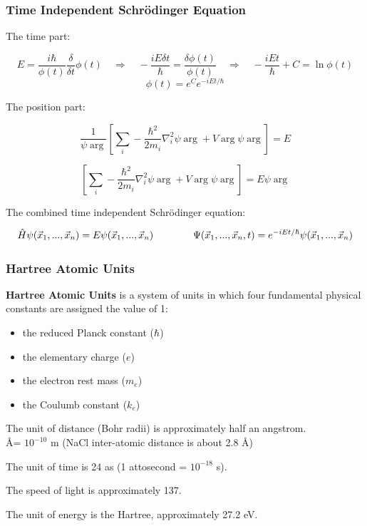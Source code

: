 \documentclass{beamer}
\begin{document}
\begin{frame}
\frametitle{Time Independent Schr\"odinger Equation}
The time part:

\[ E = \frac{i\hbar}{\phi(t)} \frac{\delta}{\delta t} \phi(t) \quad\Rightarrow\quad - \frac{i E \delta t}{\hbar} = \frac{\delta\phi(t)}{\phi(t)} \quad\Rightarrow\quad - \frac{i E t}{\hbar} + C = \ln \phi(t) \]
\[ \phi(t) = e^C e^{-iEt/\hbar}\]

The position part:

\[ \frac{1}{\psi\arg} \left[ \sum_i - \frac{\hbar^2}{2m_i}\nabla_i^2 \psi\arg + V\arg\psi\arg \right] = E \]

\[ \left[ \sum_i - \frac{\hbar^2}{2m_i}\nabla_i^2 \psi\arg + V\arg\psi\arg \right] = E \psi\arg \]

The combined time independent Schr\"odinger equation:

\[ \hat{H} \psi(\vec{x}_1,...,\vec{x}_n) = E \psi(\vec{x}_1,...,\vec{x}_n) \qquad\qquad \Psi(\vec{x}_1,...,\vec{x}_n,t) = e^{-iEt/\hbar} \psi(\vec{x}_1,...,\vec{x}_n)\]
\end{frame}

\begin{frame}
\frametitle{Hartree Atomic Units}
{\bf Hartree Atomic Units} is a system of units in which four fundamental physical constants
are assigned the value of 1:
\begin{itemize}
\item the reduced Planck constant ($\hbar$)
\item the elementary charge ($e$)
\item the electron rest mass ($m_e$)
\item the Coulumb constant ($k_e$)
\end{itemize}

\vskip 12pt

The unit of distance (Bohr radii) is approximately half an angstrom.\\
\qquad \AA = $10^{-10}$ m (NaCl inter-atomic distance is about 2.8 \AA)

\vskip 12pt

The unit of time is 24 as (1 attosecond = $10^{-18}$ s).

The speed of light is approximately 137.

The unit of energy is the Hartree, approximately 27.2 eV.
\end{frame}
\end{document}
